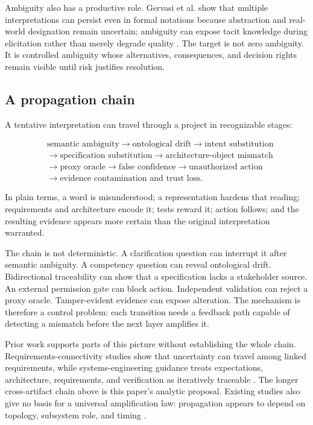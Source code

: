 \documentclass[10pt,a4paper]{article}
\begin{document}
Ambiguity also has a productive role. Gervasi et al. show that multiple interpretations can persist even in formal notations because abstraction and real-world designation remain uncertain; ambiguity can expose tacit knowledge during elicitation rather than merely degrade quality \cite{gervasi2019}. The target is not zero ambiguity. It is controlled ambiguity whose alternatives, consequences, and decision rights remain visible until risk justifies resolution.

\subsection{A propagation chain}

A tentative interpretation can travel through a project in recognizable stages:

\begin{equation}
\begin{split}
&\text{semantic ambiguity} \rightarrow \text{ontological drift}
\rightarrow \text{intent substitution} \\
&\rightarrow \text{specification substitution}
\rightarrow \text{architecture-object mismatch} \\
&\rightarrow \text{proxy oracle} \rightarrow \text{false confidence}
\rightarrow \text{unauthorized action} \\
&\rightarrow \text{evidence contamination and trust loss}.
\end{split}
\end{equation}

In plain terms, a word is misunderstood; a representation hardens that reading; requirements and architecture encode it; tests reward it; action follows; and the resulting evidence appears more certain than the original interpretation warranted.

The chain is not deterministic. A clarification question can interrupt it after semantic ambiguity. A competency question can reveal ontological drift. Bidirectional traceability can show that a specification lacks a stakeholder source. An external permission gate can block action. Independent validation can reject a proxy oracle. Tamper-evident evidence can expose alteration. The mechanism is therefore a control problem: each transition needs a feedback path capable of detecting a mismatch before the next layer amplifies it.

Prior work supports parts of this picture without establishing the whole chain. Requirements-connectivity studies show that uncertainty can travel among linked requirements, while systems-engineering guidance treats expectations, architecture, requirements, and verification as iteratively traceable \cite{salado2013,nasase2017}. The longer cross-artifact chain above is this paper's analytic proposal. Existing studies also give no basis for a universal amplification law: propagation appears to depend on topology, subsystem role, and timing \cite{salado2013,giffin2009}.
\end{document}
